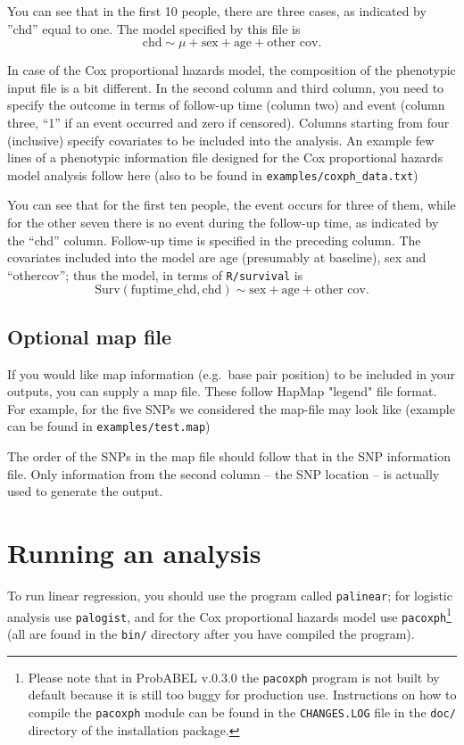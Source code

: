 \documentclass[12pt,a4paper]{article}
\begin{document}
You can see that in the first 10 people, there are three cases, as indicated
by ''chd'' equal to one. The model specified by this file
is
\begin{equation*}
\textrm{chd} \sim \mu + \textrm{sex} + \textrm{age} +
\textrm{other cov}.
\end{equation*}

In case of the Cox proportional hazards model, the composition of the
phenotypic input file is a bit different. In the second column and
third column, you need to specify the outcome in terms of follow-up
time (column two) and event (column three, ``1'' if an event occurred
and zero if censored). Columns starting from four (inclusive) specify
covariates to be included into the analysis. An example few lines of
a phenotypic information file designed for the Cox proportional hazards model
analysis follow here (also to be found in
\texttt{examples/coxph\_data.txt})



You can see that for the first ten people, the event occurs for three of
them, while for the other seven there is no event during the follow-up
time, as indicated by the ``chd'' column. Follow-up time is specified in the preceding
column. The covariates included into the model are age (presumably
at baseline), sex and ``othercov''; thus the model, in terms of
\texttt{R/survival} is
\begin{equation*}
\textrm{Surv}(\textrm{fuptime\_chd}, \textrm{chd})
\sim \textrm{sex} + \textrm{age} + \textrm{other cov}.
\end{equation*}

\subsection{Optional map file}
If you would like map information (e.g.~base pair position) to
be included in your outputs, you can supply a map file. These follow
HapMap "legend" file format. For example, for the five SNPs we considered
the map-file may look like (example can be found in
\texttt{examples/test.map})



The order of the SNPs in the map file should follow that in the SNP information
file. Only information from the second column -- the SNP location -- is
actually used to generate the output.

\section{Running an analysis}
\label{sec:runanalysis}
To run linear regression, you should use the program called
\texttt{palinear}; for logistic analysis use \texttt{palogist}, and
for the Cox proportional hazards model use
\texttt{pacoxph}\footnote{Please note that in ProbABEL v.0.3.0 the
  \texttt{pacoxph} program is not built by default because it is still
  too buggy for production use. Instructions on how to compile the
  \texttt{pacoxph} module can be found in the \texttt{CHANGES.LOG}
  file in the \texttt{doc/} directory of the installation package.}
(all are found in the \texttt{bin/} directory after you have compiled
the program).
\end{document}
